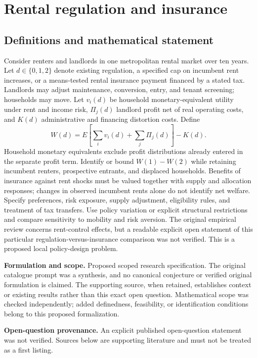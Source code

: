 \documentclass[11pt]{article}
\begin{document}
\section*{Rental regulation and insurance}\label{30007745}
\subsection{Definitions and mathematical statement}
Consider renters and landlords in one metropolitan rental market over ten years. Let \(d\in\{0,1,2\}\) denote existing regulation, a specified cap on incumbent rent increases, or a means-tested rental insurance payment financed by a stated tax. Landlords may adjust maintenance, conversion, entry, and tenant screening; households may move. Let \(v_i(d)\) be household monetary-equivalent utility under rent and income risk, \(\Pi_j(d)\) landlord profit net of real operating costs, and \(K(d)\) administrative and financing distortion costs. Define
\[W(d)=E\!\left[\sum_i v_i(d)+\sum_j\Pi_j(d)\right]-K(d).\]
Household monetary equivalents exclude profit distributions already entered in the separate profit term. Identify or bound \(W(1)-W(2)\) while retaining incumbent renters, prospective entrants, and displaced households. Benefits of insurance against rent shocks must be valued together with supply and allocation responses; changes in observed incumbent rents alone do not identify net welfare. Specify preferences, risk exposure, supply adjustment, eligibility rules, and treatment of tax transfers. Use policy variation or explicit structural restrictions and compare sensitivity to mobility and risk aversion. The original empirical review concerns rent-control effects, but a readable explicit open statement of this particular regulation-versus-insurance comparison was not verified. This is a proposed local policy-design problem.

\par\textbf{Formulation and scope.} Proposed scoped research specification. The original catalogue prompt was a synthesis, and no canonical conjecture or verified original formulation is claimed. The supporting source, when retained, establishes context or existing results rather than this exact open question. Mathematical scope was checked independently; added definedness, feasibility, or identification conditions belong to this proposed formalization.

\par\textbf{Open-question provenance.} An explicit published open-question statement was not verified. Sources below are supporting literature and must not be treated as a first listing.
\end{document}
